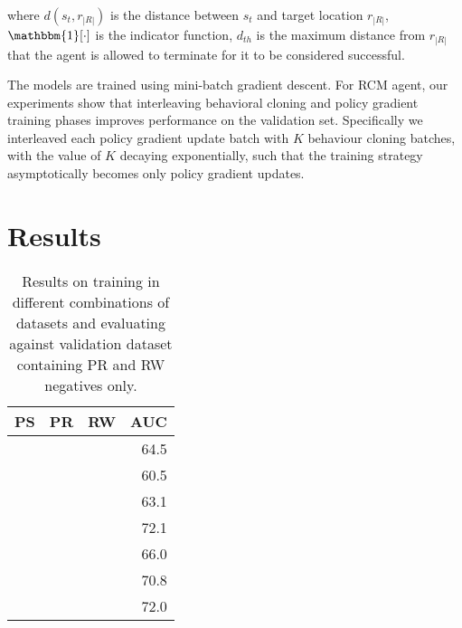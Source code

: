 \documentclass[10pt,twocolumn,letterpaper]{article}
\newcommand\indicator[1]{\mathbbm{1}[#1]}
\newcommand{\cmark}{\ding{51}}\newcommand{\xmark}{\ding{55}}\newcommand{\taskcma}{\textsc{cma}}
\begin{document}
\noindent
where $d(s_t, r_{|R|})$ is the distance between $s_t$ and target location $r_{|R|}$, $\indicator{\cdot}$ is the indicator function, $d_{th}$ is the maximum distance from $r_{|R|}$ that the agent is allowed to terminate for it to be considered successful.

The models are trained using mini-batch gradient descent. For RCM agent, our experiments show that interleaving behavioral cloning and policy gradient training phases improves performance on the validation set. Specifically we interleaved each policy gradient update batch with $K$ behaviour cloning batches, with the value of $K$ decaying exponentially, such that the training strategy asymptotically becomes only policy gradient updates.
 
\section{Results}
\label{sec:results}

\begin{table}
\centering
\begin{tabular}{lll|r}
 PS        & PR        & RW         & AUC \\
\hline
 \cmark    &           &            & 64.5 \\
           & \cmark    &            & 60.5 \\
           &           & \cmark     & 63.1 \\
 \cmark    & \cmark    &            & 72.1 \\
           & \cmark    & \cmark     & 66.0 \\ 
 \cmark    &           & \cmark     & 70.8 \\
 \cmark    & \cmark    & \cmark     & 72.0 \\
\end{tabular}
\caption{Results on training in different combinations of datasets and evaluating against validation dataset containing PR and RW negatives only.\label{tab:sampling-strategy}}
\end{table}
\end{document}
